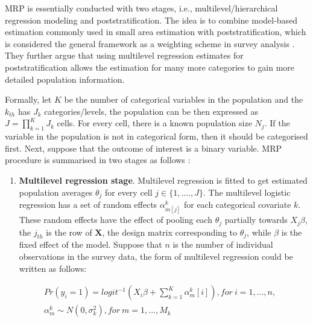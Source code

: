 \documentclass{monashthesis}
\begin{document}
MRP is essentially conducted with two stages, i.e., multilevel/hierarchical regression modeling and poststratification. The idea is to combine model-based estimation commonly used in small area estimation with poststratification, which is considered the general framework as a weighting scheme in survey analysis \autocite{Gelman97poststratificationinto}. They further argue that using multilevel regression estimates for poststratification allows the estimation for many more categories to gain more detailed population information.

Formally, let \(K\) be the number of categorical variables in the population and the \(k_{th}\) has \(J_k\) categories/levels, the population can be then expressed as \(J = \prod_{k=1}^K J_k\) cells. For every cell, there is a known population size \(N_j\). If the variable in the population is not in categorical form, then it should be categorised first. Next, suppose that the outcome of interest is a binary variable. MRP procedure is summarised in two stages as follows \autocite{GaoYuxiang2021IMRa}:

\begin{enumerate}
\def\labelenumi{\arabic{enumi}.}
\tightlist
\item
  \textbf{Multilevel regression stage}. Multilevel regression is fitted to get estimated population averages \(\theta_j\) for every cell \(j \in \{1, ...., J\}\). The multilevel logistic regression has a set of random effects \(\alpha^k_{m[j]}\) for each categorical covariate \(k\). These random effects have the effect of pooling each \(\theta_j\) partially towards \(X_j\beta\), the \(j_{th}\) is the row of \(\textbf{X}\), the design matrix corresponding to \(\theta_j\), while \(\beta\) is the fixed effect of the model. Suppose that \(n\) is the number of individual observations in the survey data, the form of multilevel regression could be written as follows:
\end{enumerate}

\begin{equation} 
\begin{split}
& Pr(y_i = 1) = logit^{-1}\left(X_i\beta + \sum^K_{k=1}\alpha^k_m[i]\right), for\ i=1, ..., n,\\
& \alpha^k_m \sim N(0, \sigma^2_k), for\ m = 1, ..., M_k
\end{split}
\label{eq:mrp-stage1}
\end{equation}
\end{document}
